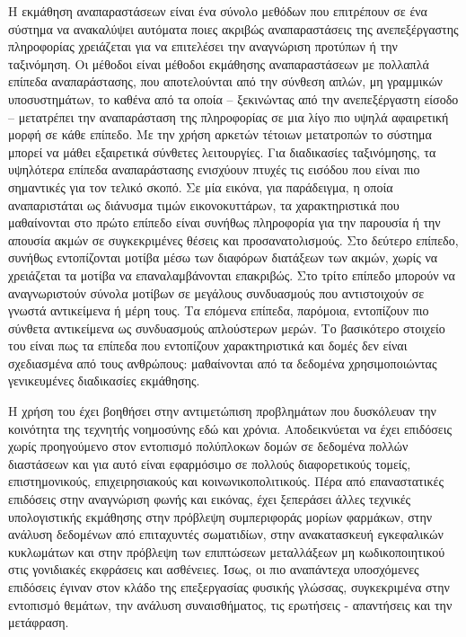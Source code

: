 Η εκμάθηση αναπαραστάσεων είναι ένα σύνολο μεθόδων που επιτρέπουν σε ένα σύστημα να ανακαλύψει αυτόματα ποιες ακριβώς αναπαραστάσεις της ανεπεξέργαστης πληροφορίας χρειάζεται για να επιτελέσει την αναγνώριση προτύπων ή την ταξινόμηση. 
Οι μέθοδοι  είναι μέθοδοι εκμάθησης αναπαραστάσεων με πολλαπλά επίπεδα αναπαράστασης, που αποτελούνται από την σύνθεση απλών, μη γραμμικών υποσυστημάτων, το καθένα από τα οποία -- ξεκινώντας από την ανεπεξέργαστη είσοδο -- μετατρέπει την αναπαράσταση της πληροφορίας σε μια λίγο πιο υψηλά αφαιρετική μορφή σε κάθε επίπεδο.
Με την χρήση αρκετών τέτοιων μετατροπών το σύστημα μπορεί να μάθει εξαιρετικά σύνθετες λειτουργίες.
Για διαδικασίες ταξινόμησης, τα υψηλότερα επίπεδα αναπαράστασης ενισχύουν πτυχές τις εισόδου που είναι πιο σημαντικές για τον τελικό σκοπό.
Σε μία εικόνα, για παράδειγμα, η οποία αναπαριστάται ως διάνυσμα τιμών εικονοκυττάρων, τα χαρακτηριστικά που μαθαίνονται στο πρώτο επίπεδο είναι συνήθως πληροφορία για την παρουσία ή την απουσία ακμών σε συγκεκριμένες θέσεις και προσανατολισμούς.
Στο δεύτερο επίπεδο, συνήθως εντοπίζονται μοτίβα μέσω των διαφόρων διατάξεων των ακμών, χωρίς να χρειάζεται τα μοτίβα να επαναλαμβάνονται επακριβώς.
Στο τρίτο επίπεδο μπορούν να αναγνωριστούν σύνολα μοτίβων σε μεγάλους συνδυασμούς που αντιστοιχούν σε γνωστά αντικείμενα ή μέρη τους.
Τα επόμενα επίπεδα, παρόμοια, εντοπίζουν πιο σύνθετα αντικείμενα ως συνδυασμούς απλούστερων μερών.
Το βασικότερο στοιχείο του  είναι πως τα επίπεδα που εντοπίζουν χαρακτηριστικά και δομές δεν είναι σχεδιασμένα από τους ανθρώπους: μαθαίνονται από τα δεδομένα χρησιμοποιώντας γενικευμένες διαδικασίες εκμάθησης.

Η χρήση του  έχει βοηθήσει στην αντιμετώπιση προβλημάτων που δυσκόλευαν την κοινότητα της τεχνητής νοημοσύνης εδώ και χρόνια. 
Αποδεικνύεται να έχει επιδόσεις χωρίς προηγούμενο στον εντοπισμό πολύπλοκων δομών σε δεδομένα πολλών διαστάσεων και για αυτό είναι εφαρμόσιμο σε πολλούς διαφορετικούς τομείς, επιστημονικούς, επιχειρησιακούς και κοινωνικοπολιτικούς.
Πέρα από επαναστατικές επιδόσεις στην αναγνώριση φωνής και εικόνας, έχει ξεπεράσει άλλες τεχνικές υπολογιστικής εκμάθησης στην πρόβλεψη συμπεριφοράς μορίων φαρμάκων, στην ανάλυση δεδομένων από επιταχυντές σωματιδίων, στην ανακατασκευή εγκεφαλικών κυκλωμάτων και στην πρόβλεψη των επιπτώσεων μεταλλάξεων μη κωδικοποιητικού  στις γονιδιακές εκφράσεις και ασθένειες.
Ίσως, οι πιο αναπάντεχα υποσχόμενες επιδόσεις έγιναν στον κλάδο της επεξεργασίας φυσικής γλώσσας, συγκεκριμένα στην εντοπισμό θεμάτων, την ανάλυση συναισθήματος, τις ερωτήσεις - απαντήσεις και την μετάφραση.

